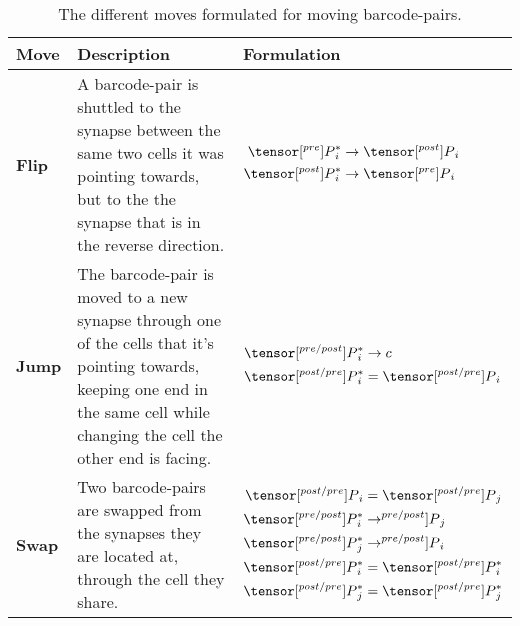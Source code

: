 \documentclass[../dissertation.tex]{subfiles}
\begin{document}
\begin{table}
    \centering
    \begin{tabulary}{\linewidth}{@{}lLl@{}}
        \toprule
        Move    & Description   & Formulation \\
            \midrule \textbf{Flip}
        &   A barcode-pair is shuttled to the synapse between the same two cells it was pointing towards, but to the the synapse that is in the reverse direction.
        & $ \begin{aligned}
                \tensor[^{pre}]{P}{^*_i} & \rightarrow \tensor[^{post}]{P}{_i} \\
                \tensor[^{post}]{P}{^*_i} & \rightarrow \tensor[^{pre}]{P}{_i}
            \end{aligned} $
        \\  \midrule \textbf{Jump}
        &   The barcode-pair is moved to a new synapse through one of the cells that it's pointing towards, keeping one end in the same cell while changing the cell the other end is facing.
        & $ \begin{aligned}
                \tensor[^{pre/post}]{P}{^*_i} & \rightarrow c \\
                \tensor[^{post/pre}]{P}{^*_i} & = \tensor[^{post/pre}]{P}{_i}
            \end{aligned} $
        \\  \midrule \textbf{Swap}
        &   Two barcode-pairs are swapped from the synapses they are located at, through the cell they share.
        & $ \begin{aligned}
                \tensor[^{post/pre}]{P}{_i} & = \tensor[^{post/pre}]{P}{_j}     \\
                \tensor[^{pre/post}]{P}{^*_i} & \rightarrow ^{pre/post}]{P}{_j} \\
                \tensor[^{pre/post}]{P}{^*_j} & \rightarrow ^{pre/post}]{P}{_i} \\
                \tensor[^{post/pre}]{P}{^*_i} & = \tensor[^{post/pre}]{P}{^*_i} \\
                \tensor[^{post/pre}]{P}{^*_j} & = \tensor[^{post/pre}]{P}{^*_j} \\
            \end{aligned} $
        \\
        \midrule
    \end{tabulary}
    \caption{The different moves formulated for moving barcode-pairs.}
    \label{tab:cc-moves}
\end{table}
\end{document}
